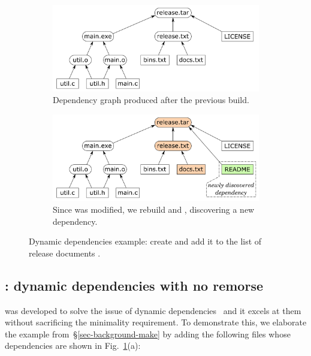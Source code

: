\begin{figure}[h]
\begin{subfigure}[b]{0.90\linewidth}
\centerline{\includegraphics[scale=0.28]{fig/shake-example.pdf}}
\caption{Dependency graph produced after the previous build.}
\end{subfigure}
\begin{subfigure}[b]{0.90\linewidth}
\centerline{\includegraphics[scale=0.28]{fig/shake-example-rebuild.pdf}}
\caption{Since  was modified, we rebuild  and
, discovering a new dependency.}
\end{subfigure}
\vspace{-2mm}
\caption{Dynamic dependencies example: create  and add it to the
list of release documents .\label{fig-shake}}
\vspace{-2mm}
\end{figure}

\subsection{\Shake: dynamic dependencies with no remorse}
\label{sec-background-shake}

\Shake was developed to solve the issue of dynamic
dependencies~\cite{mitchell2012shake} and it excels at them without sacrificing
the minimality requirement. To demonstrate this, we elaborate the \Make example
from~\S\ref{sec-background-make} by adding the following files whose
dependencies are shown in Fig.~\ref{fig-shake}(a):

